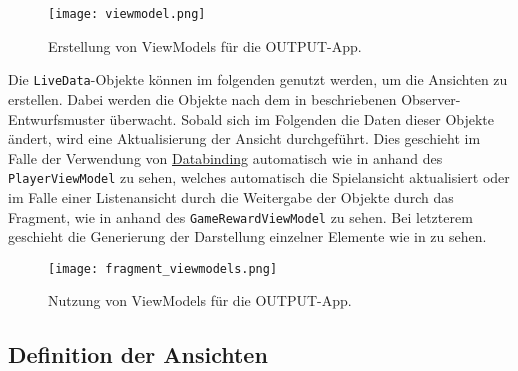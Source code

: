 \begin{figure}[H]
    \texttt{[image: viewmodel.png]}
    \caption{Erstellung von ViewModels für die OUTPUT-App.}\label{fig:viewmodel}
\end{figure}

Die \texttt{LiveData}-Objekte können im folgenden genutzt werden, um die Ansichten zu erstellen. Dabei werden die Objekte nach dem in  beschriebenen Observer-Entwurfsmuster überwacht. Sobald sich im Folgenden die Daten dieser Objekte ändert, wird eine Aktualisierung der Ansicht durchgeführt. Dies geschieht im Falle der Verwendung von \hyperref[subsec:databinding]{Databinding} automatisch wie in  anhand des \texttt{PlayerViewModel} zu sehen, welches automatisch die Spielansicht aktualisiert oder im Falle einer Listenansicht durch die Weitergabe der Objekte durch das Fragment, wie in  anhand des \texttt{GameRewardViewModel} zu sehen. Bei letzterem geschieht die Generierung der Darstellung einzelner Elemente wie in  zu sehen.

\begin{figure}[H]
    \texttt{[image: fragment\_viewmodels.png]}
    \caption{Nutzung von ViewModels für die OUTPUT-App.}\label{fig:fragment_viewmodels}
\end{figure}

\subsection{Definition der Ansichten}

